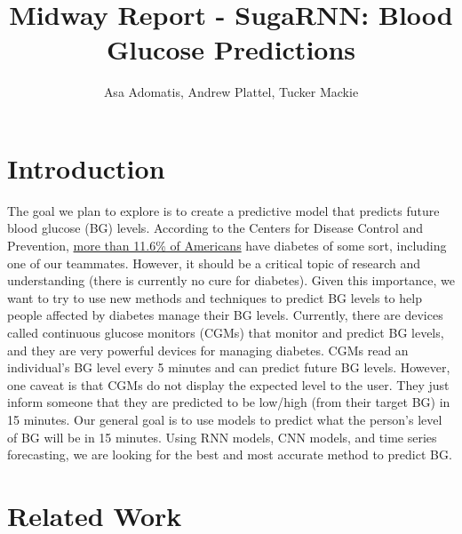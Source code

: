 \documentclass{article}
\title{Midway Report - SugaRNN: Blood Glucose Predictions}
\author{Asa Adomatis, Andrew Plattel, Tucker Mackie}
\begin{document}
\maketitle

\section*{Introduction}

The goal we plan to explore is to create a predictive model that predicts future blood
glucose (BG) levels. According to the Centers for Disease Control and Prevention, \href{https://www.cdc.gov/diabetes/php/data-research/index.html}{more than 11.6\% of
Americans} have diabetes of some sort, including one of our teammates. However, it should be a critical topic of research and understanding (there is currently no cure for diabetes). Given this importance, we want to try to use new methods and techniques to predict BG levels to help people affected by diabetes manage their
BG levels. Currently, there are devices called continuous glucose monitors (CGMs) that
monitor and predict BG levels, and they are very powerful devices for managing
diabetes. CGMs read an individual's BG level every 5 minutes and can predict future
BG levels. However, one caveat is that CGMs do not display the expected level to the user.
They just inform someone that they are predicted to be low/high (from their target BG) in
15 minutes. Our general goal is to use models to predict what the person's level of BG will be in 15 minutes. Using RNN models, CNN models, and time series forecasting, we are looking for the best and most accurate method to predict BG. 

\section*{Related Work}
\end{document}
